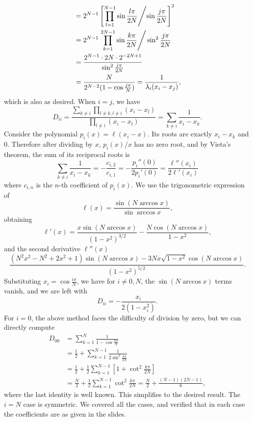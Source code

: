 \documentclass{homework}
\begin{document}
\begin{problem}
\begin{align*}
&= 2^{N-1}\left[ \prod_{l=1}^{N-1}\sin\frac{l\pi}{2N} \middle/ \sin\frac{j\pi}{2N} \right]^2\\
&=2^{N-1} \left.\prod_{k=1}^{2N-1} \sin\frac{k\pi}{2N} \right/ \sin^2\frac{j\pi}{2N}\\
&= \frac{2^{N-1} \cdot 2N \cdot 2^{-2N+1}}{ \sin^2 \frac{j\pi}{2N}} \\
&= \frac{N}{2^{N-2}(1-\cos \frac{j\pi}{N})} = \frac{1}{\lambda_i(x_i - x_j)},
\end{align*}
which is also as desired. When \(i = j\), we have
\[D_{ii} = \frac{\sum_{k\ne i} \prod_{l\ne k, l\ne i} (x_i - x_l)}{\prod_{l\ne i}(x_i - x_l)} = \sum_{k\ne i} \frac{1}{x_i - x_k}.\]
Consider the polynomial \(p_i(x) = \ell(x_i - x)\). Its roots are exactly \(x_i - x_k\) and \(0\). Therefore after dividing by \(x\), \(p_i(x)/x\) has no zero root, and by Vieta's theorem, the sum of its reciprocal roots is
\[\sum_{k\ne i}\frac{1}{x_i - x_k} = -\frac{c_{i,2}}{c_{i,1}} = -\frac{p_i''(0)}{2p_i'(0)} = \frac{\ell''(x_i)}{2\ell'(x_i)}\]
where \(c_{i,n}\) is the \(n\)-th coefficient of \(p_i(x)\). We use the trigonometric expression of
\[\ell(x) = \frac{\sin(N\arccos x)}{\sin\arccos x},\]
obtaining
\[\ell'(x) = \frac{x\sin(N\arccos x)}{(1-x^2)^{3/2}}-\frac{N\cos(N\arccos x)}{1-x^2},\]
and the second derivative \(\ell''(x)\)
\[\frac{(N^{2} x^{2} - N^{2} + 2 x^{2} + 1)\sin(N\arccos x) - 3 N x \sqrt{1 - x^{2}} \cos{(N\arccos x)}}{(1-x^2)^{5/2}}.\]
Substituting \(x_i = \cos\frac{i\pi}{N}\), we have for \(i \ne 0,N\), the \(\sin(N\arccos x)\) terms vanish, and we are left with
\[D_{ii} = -\frac{x_i}{2(1-x_i^2)}.\] For \(i=0\), the above method faces the difficulty of division by zero, but we can directly compute
\begin{align*}
D_{00} &= \sum_{k=1}^N \frac{1}{1-\cos\frac{k\pi}{N}}\\
&= \frac12 + \sum_{k=1}^{N-1} \frac{1}{2\sin^2\frac{k\pi}{2N}}\\
&= \frac12 + \frac12 \sum_{k=1}^{N-1} \left[1 + \cot^2 \frac{k\pi}{2N}\right]\\
&= \frac N2 + \frac12 \sum_{k=1}^{N-1} \cot^2 \frac{k\pi}{2N} = \frac{N}{2}+ \frac{(N-1)(2N-1)}{6},
\end{align*}
where the last identity is well known. This simplifies to the desired result. The \(i=N\) case is symmetric. We covered all the cases, and verified that in each case the coefficients are as given in the slides.
\end{problem}
\end{document}
